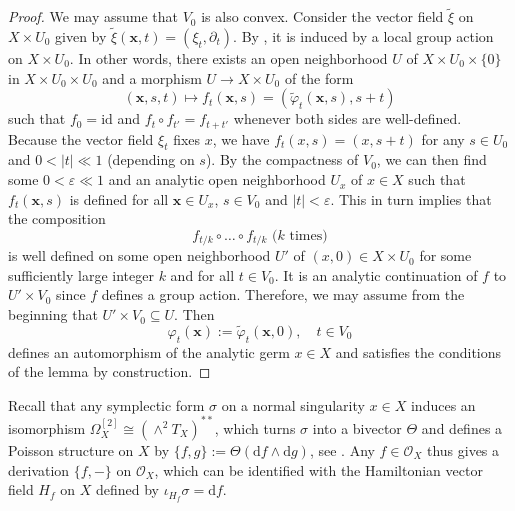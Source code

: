 \documentclass[12pt]{amsart}
\theoremstyle{definition}
\newcommand{\cO}{\mathcal{O}}
\newcommand{\rd}{\mathrm{d}}
\numberwithin{equation}{section}
\begin{document}
\begin{proof}
We may assume that $V_0$ is also convex. Consider the vector field $\widetilde{\xi}$ on $X\times U_0$ given by $\widetilde{\xi}(\mathbf{x},t) = (\xi_t,\partial_t)$. By \cite[Satz 3]{Kau-group-action}, it is induced by a local group action on $X\times U_0$. In other words, there exists an open neighborhood $U$ of $X\times U_0\times \{0\}$ in $X\times U_0\times U_0$ and a morphism $U\to X\times U_0$ of the form $$(\mathbf{x},s,t)\mapsto f_t(\mathbf{x},s) =  (\widetilde{\varphi}_t(\mathbf{x},s),s+t)$$ such that $f_0=\mathrm{id}$ and $f_t\circ f_{t'} = f_{t+t'}$ whenever both sides are well-defined. Because the vector field $\xi_t$ fixes $x$, we have $f_t(x,s)=(x,s+t)$ for any $s\in U_0$ and $0<|t|\ll 1$ (depending on $s$). By the compactness of $V_0$, we can then find some $0<\varepsilon\ll 1$ and an analytic open neighborhood $U_x$ of $x\in X$ such that $f_t(\mathbf{x},s)$ is defined for all $\mathbf{x}\in U_x$, $s\in V_0$ and $|t|<\varepsilon$. This in turn implies that the composition 
\[ f_{t/k}\circ \dots \circ f_{t/k} \mbox {\ \ \ ($k$ times)}
\] is well defined on some open neighborhood $U'$ of $(x,0)\in X\times U_0$ for some sufficiently large integer $k$ and for all $t\in V_0$. It is an analytic continuation of $f$ to $U'\times V_0$ since $f$ defines a group action. Therefore, we may assume from the beginning that $U'\times V_0\subseteq U$. Then 
\[
\varphi_t (\mathbf{x}) := \widetilde{\varphi}_t (\mathbf{x},0), \quad t\in V_0
\]
defines an automorphism of the analytic germ $x\in X$ and satisfies the conditions of the lemma by construction.
\end{proof}

Recall that any symplectic form $\sigma$ on a normal singularity $x\in X$ induces an isomorphism $\Omega_X^{[2]}\cong (\wedge^{2}T_X)^{**}$, which turns $\sigma$ into a bivector $\Theta$ and defines a Poisson structure on $X$ by $\{f,g\}:=\Theta(\rd f\wedge \rd g)$, see \cite{Kaledin-sym}. Any $f\in \cO_X$ thus gives a derivation $\{f,-\}$ on $\cO_X$, which can be identified with the Hamiltonian vector field $H_f$ on $X$ defined by $\iota_{H_f}\sigma = \rd f$. 
\end{document}

